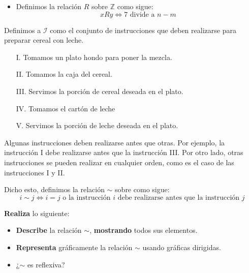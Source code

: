 \documentclass[oneside]{style}
\begin{document}
\begin{questions}[label=\protect\circled{\bfseries\arabic*}]
{\begin{itemize}
            \item Definimos la relación $R$ sobre $\mathbb{Z}$ como sigue:
            \begin{equation*}
                xRy \Leftrightarrow 7 \text{ divide a } n-m
            \end{equation*}
        \end{itemize}
    }

    \newpage
    \question
    {
        Definimos a $\mathcal{I}$ como el conjunto de instrucciones que deben 
        realizarse para preparar cereal con leche.
        \begin{itemize}
            \item[I.] Tomamos un plato hondo para poner la mezcla.
            \item[II.] Tomamos la caja del cereal.
            \item[III.] Servimos la porción de cereal deseada en el plato.
            \item[IV.] Tomamos el cartón de leche
            \item[V.] Servimos la porción de leche deseada en el plato. 
        \end{itemize}
        
        Algunas instrucciones deben realizarse antes que otras. Por ejemplo, 
        la instrucción I debe realizarse antes que la instrucción III. Por 
        otro lado, otras instrucciones se pueden realizar en cualquier orden, 
        como es el caso de las instrucciones I y II. 
        
        Dicho esto, definimos la relación $\sim$ sobre  como sigue:
        \begin{equation*}
            i \sim j \Leftrightarrow i=j \text{ o la instrucción } i 
            \text{ debe realizarse antes que la instrucción } j
        \end{equation*}

        \textbf{Realiza} lo siguiente:
        \begin{itemize}
            \item \textbf{Describe} la relación $\sim$, \textbf{mostrando} 
            todos sus elementos.

            \item \textbf{Representa} gráficamente la relación $\sim$ usando 
            gráficas dirigidas.

            \item ¿$\sim$ es reflexiva? 
            

\end{itemize}}
\end{questions}
\end{document}
